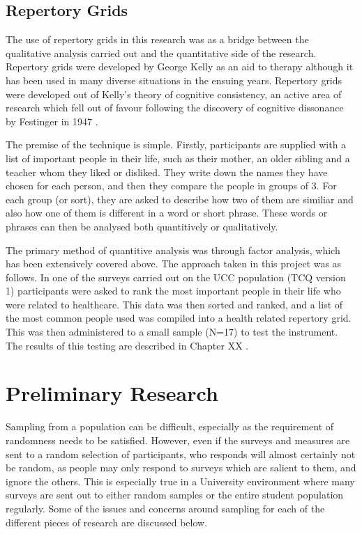\subsection{Repertory Grids}

The use of repertory grids in this research was as a bridge between the qualitative analysis carried out and the quantitative side of the research. Repertory grids were developed by George Kelly as an aid to therapy \cite{kelly2003psychology} although it has been used in many diverse situations in the ensuing years. Repertory grids were developed out of Kelly's theory of cognitive consistency, an active area of research which fell out of favour following the discovery of cognitive dissonance by Festinger in 1947 \cite{greenwald2002}. 

The premise of the technique is simple. Firstly, participants are supplied with a list of important people in their life, such as their mother, an older sibling and a teacher whom they liked or disliked. They write down the names they have chosen for each person, and then they compare the people in groups of 3. For each group (or sort), they are asked to describe how two of them are similiar and also how one of them is different in a word or short phrase. These words or phrases can then be analysed both quantitively or qualitatively. 

The primary method of quantitive analysis was through factor analysis, which has been extensively covered above. The approach taken in this project was as follows. In one of the surveys carried out on the UCC population (TCQ version 1) participants were asked to rank the most important people in their life who were related to healthcare. This data was then sorted and ranked, and a list of the most common people used was compiled into a health related repertory grid. This was then administered to a small sample (N=17) to test the instrument. The results of this testing are described in Chapter XX .%

\section{Preliminary Research}

 Sampling from a population can be difficult, especially as the requirement of randomness needs to be satisfied. However, even if the surveys and measures are sent to a random selection of participants, who responds will almost certainly not be random, as people may only respond to surveys which are salient to them, and ignore the others. This is especially true in a University environment where many surveys are sent out to either random samples or the entire student population regularly. Some of the issues and concerns around sampling for each of the different pieces of research are discussed below.

